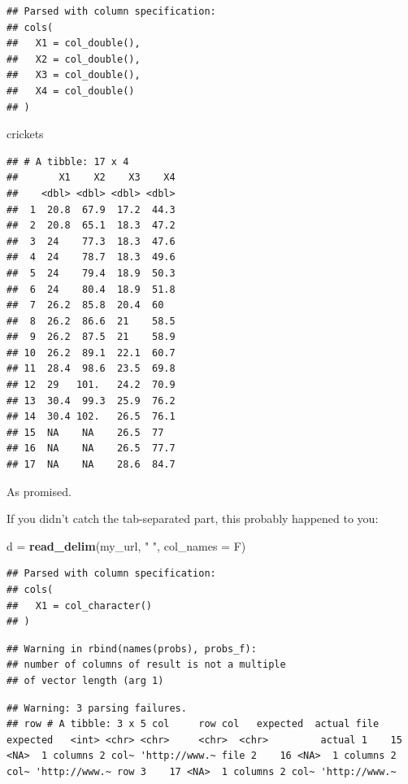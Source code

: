 \documentclass[]{tufte-book}
\newenvironment{Shaded}{}{}
\newcommand{\DataTypeTok}[1]{\textcolor[rgb]{0.56,0.13,0.00}{#1}}
\newcommand{\KeywordTok}[1]{\textcolor[rgb]{0.00,0.44,0.13}{\textbf{#1}}}
\newcommand{\NormalTok}[1]{#1}
\newcommand{\StringTok}[1]{\textcolor[rgb]{0.25,0.44,0.63}{#1}}
\theoremstyle{definition}
\theoremstyle{definition}
\theoremstyle{definition}
\theoremstyle{remark}
\begin{document}
\begin{verbatim}
## Parsed with column specification:
## cols(
##   X1 = col_double(),
##   X2 = col_double(),
##   X3 = col_double(),
##   X4 = col_double()
## )
\end{verbatim}

\begin{Shaded}
\begin{Highlighting}[]
\NormalTok{crickets}
\end{Highlighting}
\end{Shaded}

\begin{verbatim}
## # A tibble: 17 x 4
##       X1    X2    X3    X4
##    <dbl> <dbl> <dbl> <dbl>
##  1  20.8  67.9  17.2  44.3
##  2  20.8  65.1  18.3  47.2
##  3  24    77.3  18.3  47.6
##  4  24    78.7  18.3  49.6
##  5  24    79.4  18.9  50.3
##  6  24    80.4  18.9  51.8
##  7  26.2  85.8  20.4  60  
##  8  26.2  86.6  21    58.5
##  9  26.2  87.5  21    58.9
## 10  26.2  89.1  22.1  60.7
## 11  28.4  98.6  23.5  69.8
## 12  29   101.   24.2  70.9
## 13  30.4  99.3  25.9  76.2
## 14  30.4 102.   26.5  76.1
## 15  NA    NA    26.5  77  
## 16  NA    NA    26.5  77.7
## 17  NA    NA    28.6  84.7
\end{verbatim}

As promised.

If you didn't catch the tab-separated part, this probably happened to
you:

\begin{Shaded}
\begin{Highlighting}[]
\NormalTok{d =}\StringTok{ }\KeywordTok{read_delim}\NormalTok{(my_url, }\StringTok{" "}\NormalTok{, }\DataTypeTok{col_names =}\NormalTok{ F)}
\end{Highlighting}
\end{Shaded}

\begin{verbatim}
## Parsed with column specification:
## cols(
##   X1 = col_character()
## )
\end{verbatim}

\begin{verbatim}
## Warning in rbind(names(probs), probs_f):
## number of columns of result is not a multiple
## of vector length (arg 1)
\end{verbatim}

\begin{verbatim}
## Warning: 3 parsing failures.
## row # A tibble: 3 x 5 col     row col   expected  actual file          expected   <int> <chr> <chr>     <chr>  <chr>         actual 1    15 <NA>  1 columns 2 col~ 'http://www.~ file 2    16 <NA>  1 columns 2 col~ 'http://www.~ row 3    17 <NA>  1 columns 2 col~ 'http://www.~
\end{verbatim}
\end{document}

